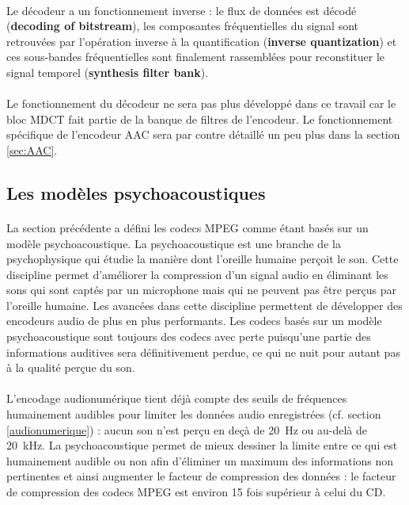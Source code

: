 \documentclass{article}
\begin{document}
    \paragraph{}
    Le décodeur a un fonctionnement inverse : le flux de données est décodé (\textbf{decoding of bitstream}), les composantes fréquentielles du signal sont retrouvées par l'opération inverse à la quantification (\textbf{inverse quantization}) et ces sous-bandes fréquentielles sont finalement rassemblées pour reconstituer le signal temporel (\textbf{synthesis filter bank}).

    \paragraph{}
    Le fonctionnement du décodeur ne sera pas plus développé dans ce travail car le bloc MDCT fait partie de la banque de filtres de l'encodeur. Le fonctionnement spécifique de l'encodeur AAC sera par contre détaillé un peu plus dans la section \ref{sec:AAC}.



    \subsection{Les modèles psychoacoustiques}
    \label{sec:pychoacoustic}
    \paragraph{}
    La section précédente a défini les codecs MPEG comme étant basés sur un modèle psychoacoustique. La psychoacoustique est une branche de la psychophysique qui étudie la manière dont l'oreille humaine perçoit le son\cite{wiki:psychoacoustic}. Cette discipline permet d'améliorer la compression d'un signal audio en éliminant les sons qui sont captés par un microphone mais qui ne peuvent pas être perçus par l'oreille humaine. Les avancées dans cette discipline permettent de développer des encodeurs audio de plus en plus performants. Les codecs basés sur un modèle psychoacoustique sont toujours des codecs avec perte puisqu'une partie des informations auditives sera définitivement perdue, ce qui ne nuit pour autant pas à la qualité perçue du son.

    \paragraph{}
    L'encodage audionumérique tient déjà compte des seuils de fréquences humainement audibles pour limiter les données audio enregistrées (cf. section \ref{audionumerique}) : aucun son n'est perçu en deçà de \SI{20}{\hertz} ou au-delà de \SI{20}{\kilo\hertz}. La psychoacoustique permet de mieux dessiner la limite entre ce qui est humainement audible ou non afin d'éliminer un maximum des informations non pertinentes et ainsi augmenter le facteur de compression des données : le facteur de compression des codecs MPEG est environ 15 fois supérieur à celui du CD\cite{2019-Herre-Dick}.
\end{document}
